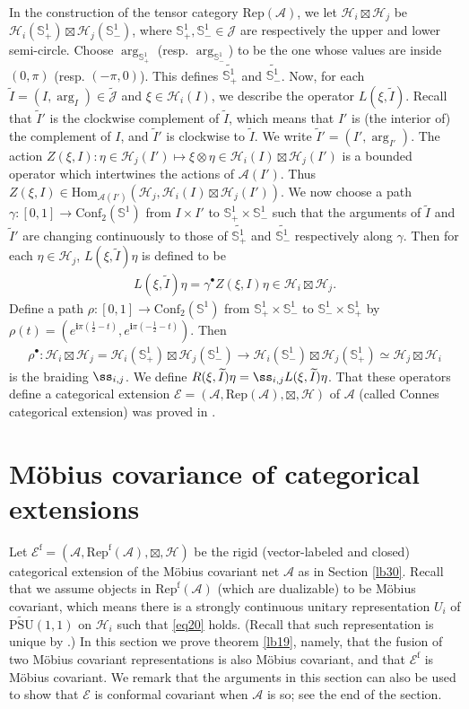 \documentclass[12pt,a4paper]{article}
\theoremstyle{definition}
\theoremstyle{plain}
\newcommand{\mc}{\mathcal}
\newcommand{\wtd}{\widetilde}
\newcommand{\Hom}{\mathrm{Hom}}
\newcommand{\Conf}{\mathrm{Conf}}
\newcommand{\UPSU}{\widetilde{\mathrm{PSU}}(1,1)}
\newcommand{\scr}{\mathscr}
\newcommand{\Jtd}{\widetilde{\mathcal J}}
\newcommand{\im}{\mathbf{i}}
\newcommand{\RepA}{\mathrm{Rep}(\mc A)}
\newcommand{\RepfA}{\mathrm{Rep}^{\mathrm f}(\mc A)}
\newcommand{\mbb}{\mathbb}
\newcommand{\Ef}{\mathscr E^{\mathrm f}}
\numberwithin{equation}{section}
\begin{document}
In the construction of the tensor category $\RepA$, we let $\mc H_i\boxtimes \mc H_j$ be $\mc H_i(\mbb S^1_+)\boxtimes\mc H_j(\mbb S^1_-)$, where $\mbb S^1_+,\mbb S^1_-\in\mc J$ are respectively the upper and lower semi-circle. Choose $\arg_{\mbb S^1_+}$ (resp. $\arg_{\mbb S^1_-}$) to be the one whose values are inside $(0,\pi)$ (resp. $(-\pi,0)$). This defines $\wtd{\mbb S^1_+}$ and $\wtd{\mbb S^1_-}$.  Now, for each $\wtd I=(I,\arg_I)\in\Jtd$ and $\xi\in\mc H_i(I)$, we  describe the operator $L(\xi,\wtd I)$. Recall that $\wtd I'$ is the clockwise complement of $\wtd I$, which means that $I'$ is (the interior of) the complement of $I$, and $\wtd I'$ is clockwise to $\wtd I$. We write $\wtd I'=(I',\arg_{I'})$.  The action $Z(\xi,I):\eta\in\mc H_j(I')\mapsto \xi\otimes\eta\in\mc H_i(I)\boxtimes\mc H_j(I')$ is a bounded operator which intertwines the actions of $\mc A(I')$. Thus $Z(\xi,I)\in\Hom_{\mc A(I')}(\mc H_j,\mc H_i(I)\boxtimes\mc H_j(I'))$. We now choose a path $\gamma:[0,1]\rightarrow\Conf_2(\mbb S^1)$ from $I\times I'$ to $\mbb S^1_+\times\mbb S^1_-$ such that the arguments of $\wtd I$ and $\wtd I'$ are changing continuously to those of $\wtd{\mbb S^1_+}$ and $\wtd{\mbb S^1_-}$ respectively along $\gamma$. Then for each $\eta\in\mc H_j$,  $L(\xi,\wtd I)\eta$ is defined to be
\begin{align}
L(\xi,\wtd I)\eta=\gamma^\bullet Z(\xi,I)\eta\in\mc H_i\boxtimes\mc H_j.
\end{align}
Define a path $\rho:[0,1]\rightarrow\Conf_2(\mbb S^1)$ from $\mbb S^1_+\times\mbb S^1_-$ to $\mbb S^1_-\times\mbb S^1_+$ by $\rho(t)=(e^{\im\pi (\frac 12-t)},e^{\im\pi (-\frac 12-t)})$. Then
\begin{align}
\rho^\bullet: \mc H_i\boxtimes\mc H_j=\mc H_i(\mbb S^1_+)\boxtimes\mc H_j(\mbb S^1_-)\rightarrow \mc H_i(\mbb S^1_-)\boxtimes\mc H_j(\mbb S^1_+)\simeq\mc H_j\boxtimes\mc H_i
\end{align}
is the braiding $\ss_{i,j}$. We define $R(\xi,\wtd I)\eta=\ss_{i,j}L(\xi,\wtd I)\eta$. That these operators define a categorical extension $\scr E=(\mc A,\RepA,\boxtimes,\mc H)$ of $\mc A$ (called Connes categorical extension) was proved in \cite{Gui21a}.




\section{M\"obius covariance of categorical extensions}\label{lb18}

Let $\Ef=(\mc A,\RepfA,\boxtimes,\mc H)$ be the rigid (vector-labeled and closed) categorical extension of the M\"obius covariant net $\mc A$ as in Section \ref{lb30}. Recall that we assume objects in $\RepfA$ (which are dualizable) to be M\"obius covariant, which means there is a strongly continuous unitary representation $U_i$ of $\UPSU$ on $\mc H_i$ such that  \eqref{eq20} holds. (Recall that such representation is unique by \cite{GL96}.) In this section we prove theorem \ref{lb19}, namely, that the fusion of two M\"obius covariant representations is also M\"obius covariant, and that $\Ef$ is M\"obius covariant. We remark that the arguments in this section can also be used to show that $\scr E$ is conformal covariant when $\mc A$ is so; see the end of the section.
\end{document}

